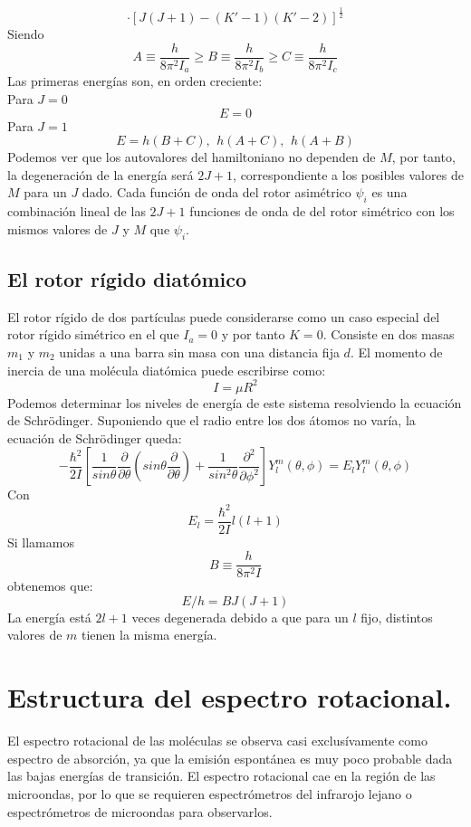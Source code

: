 \documentclass[a4paper]{article}
\begin{document}
\begin{equation}
\cdot\left[J\left(J+1\right)-\left(K'-1\right)\left(K'-2\right)\right]^\frac{1}{2}
\end{equation}
Siendo
$$
A \equiv \frac{h}{8\pi^2I_a}\geq B\equiv \frac{h}{8\pi^2I_b}\geq C\equiv \frac{h}{8\pi^2I_c}
$$
Las primeras energías son, en orden creciente:\\
Para $J = 0$
$$E = 0$$
Para $J = 1$
$$E = h(B+C), \,\ h(A+C), \,\ h(A+B)$$
Podemos ver que los autovalores del hamiltoniano no dependen de $M$, por tanto, la degeneración de la energía será $2J+1$, correspondiente a los posibles valores de $M$ para un $J$ dado.
Cada función de onda del rotor asimétrico $\psi_i$ es una combinación lineal de las $2J+1$ funciones de onda de del rotor simétrico con los mismos valores de $J$ y $M$ que $\psi_i$.
\subsection{El rotor rígido diatómico}
El rotor rígido de dos partículas puede considerarse como un caso especial del rotor rígido simétrico en el que $I_a = 0$ y por tanto $K=0$. Consiste en dos masas $m_1$ y $m_2$ unidas a una barra sin masa con una distancia fija $d$. El momento de inercia de una molécula diatómica puede escribirse como:
\begin{equation}
I=\mu R^2
\end{equation}
Podemos determinar los niveles de energía de este sistema resolviendo la ecuación de Schrödinger. Suponiendo que el radio entre los dos átomos no varía, la ecuación de Schrödinger queda:
\begin{equation}
- \frac{\hbar^2}{2I}\left[\frac{1}{sin\theta}\frac{\partial}{\partial \theta}\left(sin\theta \frac{\partial}{\partial \theta} \right) + \frac{1}{sin^2\theta}\frac{\partial^2}{\partial \phi^2}\right]Y^m_l \left(\theta,\phi \right) = E_lY^m_l \left(\theta,\phi \right)
\end{equation}
Con
$$E_l= \frac{\hbar^2}{2I}l(l+1)$$
Si llamamos $$B\equiv \frac{h}{8\pi^2I}$$
obtenemos que:
\begin{equation}
E/h=BJ(J+1)
\end{equation}
La energía está $2l+1$ veces degenerada debido a que para un $l$ fijo, distintos valores de $m$ tienen la misma energía.

\section{Estructura del espectro rotacional.}
El espectro rotacional de las moléculas se observa casi exclusívamente como espectro de absorción, ya que la emisión espontánea es muy poco probable dada las bajas energías de transición. El espectro rotacional cae en la región de las microondas, por lo que se requieren espectrómetros del infrarojo lejano o espectrómetros de microondas para observarlos.\cite{haken2013}\\
\end{document}
